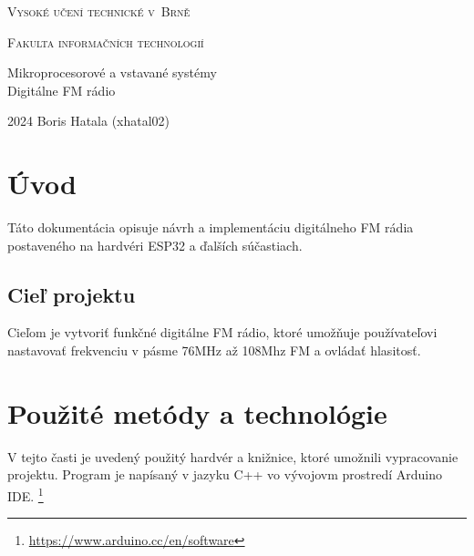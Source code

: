 \documentclass[11pt, a4paper]{article}
\begin{document}
\begin{titlepage}
\thispagestyle{empty}

    \begin{center}

        {\Huge \textsc{Vysoké učení technické v~Brně \\[0.5em]}}

        {\huge \textsc{Fakulta informačních technologií}}


        {\Large Mikroprocesorové a vstavané systémy \\[0.5em]
        \LARGE Digitálne FM rádio
         }


    \end{center}
{\Large 2024 \hfill Boris Hatala (xhatal02)}

\end{titlepage}

\newpage
\tableofcontents
\newpage


\section{Úvod}
Táto dokumentácia opisuje návrh a implementáciu digitálneho FM rádia postaveného 
na hardvéri ESP32 a ďalších súčastiach.

\subsection{Cieľ projektu}
Cieľom je vytvoriť funkčné digitálne FM rádio, 
ktoré umožňuje používateľovi nastavovať frekvenciu v pásme 76MHz až 108Mhz FM a 
ovládať hlasitosť.

\section{Použité metódy a technológie}
V tejto časti je uvedený použitý hardvér a knižnice, ktoré umožnili vypracovanie projektu. 
Program je napísaný v jazyku C++ vo vývojovm prostredí Arduino IDE. \footnote{\url{https://www.arduino.cc/en/software}}
\end{document}
